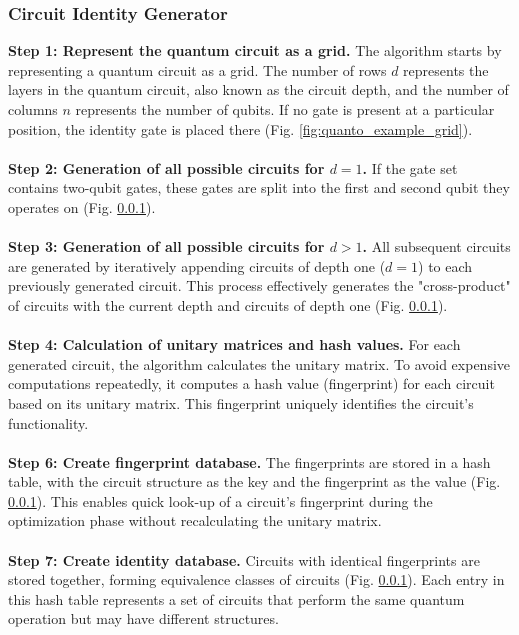 \subsubsection{Circuit Identity Generator}
\textbf{Step 1: Represent the quantum circuit as a grid.}
The algorithm starts by representing a quantum circuit as a grid. The number of rows $d$ represents the layers in the quantum circuit, also known as the circuit depth, and the number of columns $n$ represents the number of qubits. If no gate is present at a particular position, the identity gate is placed there (Fig. \ref{fig:quanto_example_grid}).
\\\\
\textbf{Step 2: Generation of all possible circuits for $d = 1$.}
If the gate set contains two-qubit gates, these gates are split into the first and second qubit they operates on (Fig. \ref{}).
\\\\
\textbf{Step 3: Generation of all possible circuits for $d > 1$.}
All subsequent circuits are generated by iteratively appending circuits of depth one ($d=1$) to each previously generated circuit. This process effectively generates the "cross-product" of circuits with the current depth and circuits of depth one (Fig. \ref{}).
\\\\
\textbf{Step 4: Calculation of unitary matrices and hash values.}
For each generated circuit, the algorithm calculates the unitary matrix. To avoid expensive computations repeatedly, it computes a hash value (fingerprint) for each circuit based on its unitary matrix. This fingerprint uniquely identifies the circuit's functionality.
\\\\
\textbf{Step 6: Create fingerprint database.}
The fingerprints are stored in a hash table, with the circuit structure as the key and the fingerprint as the value (Fig. \ref{}). This enables quick look-up of a circuit’s fingerprint during the optimization phase without recalculating the unitary matrix.
\\\\
\textbf{Step 7: Create identity database.}
Circuits with identical fingerprints are stored together, forming equivalence classes of circuits (Fig. \ref{}). Each entry in this hash table represents a set of circuits that perform the same quantum operation but may have different structures.

